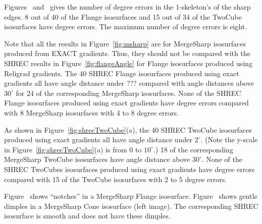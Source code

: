 Figures~ and~
gives the number of degree errors in the 1-skeleton's of the sharp edges.
8 out of 40 of the Flange isosurfaces and 15 out of 34 of the TwoCube
isosurfaces have degree errors.
The maximum number of degree errors is eight.

Note that all the results in Figure~\ref{fig:msharp} are
for MergeSharp isosurfaces produced from EXACT gradients.
Thus, they should not be compared with the SHREC results
in Figure~\ref{fig:flangeAngle} for Flange isosurfaces
produced using Religrad gradients.
The 40 SHREC Flange isosurfaces produced using exact gradients
all have angle distance under ???
compared with angle distances above $30^\circ$
for 24 of the corresponding MergeSharp isosurfaces.
None of the SHREC Flange isosurfaces produced using exact gradients
have degree errors
compared with 8 MergeSharp isosurfaces with 4 to 8 degree errors.

As shown in Figure~\ref{fig:shrecTwoCube}(a),
the 40 SHREC TwoCube isosurfaces produced using exact gradients
all have angle distance under $2^\circ$.
(Note the y-scale in Figure~\ref{fig:shrecTwoCube}(a)
is from 0 to $10^\circ$.)
18 of the corresponding MergeSharp TwoCube isosurfaces have
angle distance above $30^\circ$.
None of the SHREC TwoCubes isosurfaces produced using exact gradients
have degree errors
compared with 15 of the TwoCube isosurfaces with 2 to 5 degree errors.

Figure~\protect{} shows ``notches''
in a MergeSharp Flange isosurface.
Figure~\protect{} shows gentle dimples
in a MergeSharp Cone isosurface (left image).
The corresponding SHREC isosurface is smooth and does not have these dimples.


